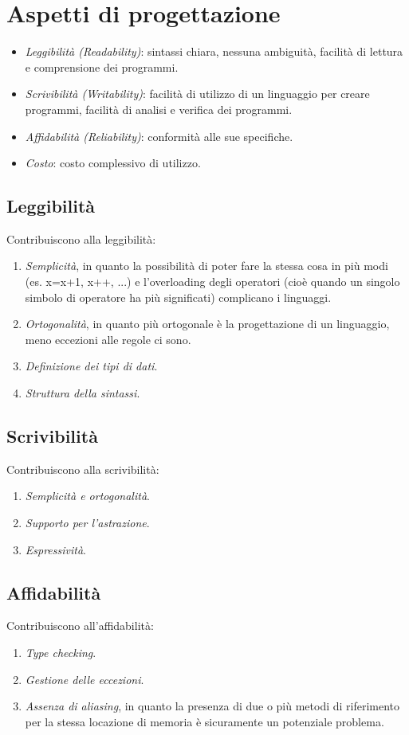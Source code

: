 \documentclass[a4paper,oneside,titlepage]{book}
\begin{document}
\section{Aspetti di progettazione}
\begin{itemize}
	\item \textit{Leggibilità (Readability)}: sintassi chiara, nessuna ambiguità, facilità di lettura e comprensione dei programmi.
	\item \textit{Scrivibilità (Writability)}: facilità di utilizzo di un linguaggio per creare programmi, facilità di analisi e verifica dei programmi.
	\item \textit{Affidabilità (Reliability)}: conformità alle sue specifiche.
	\item \textit{Costo}: costo complessivo di utilizzo.
\end{itemize}

\subsection{Leggibilità}
Contribuiscono alla leggibilità:
\begin{enumerate}
	\item \textit{Semplicità}, in quanto la possibilità di poter fare la stessa cosa in più modi (es. x=x+1, x++, ...) e l'overloading degli operatori (cioè quando un singolo simbolo di operatore ha più significati) complicano i linguaggi.
	\item \textit{Ortogonalità}, in quanto più ortogonale è la progettazione di un linguaggio, meno eccezioni alle regole ci sono.
	\item \textit{Definizione dei tipi di dati}.
	\item \textit{Struttura della sintassi}.
\end{enumerate}

\subsection{Scrivibilità}
Contribuiscono alla scrivibilità:
\begin{enumerate}
	\item \textit{Semplicità e ortogonalità}.
	\item \textit{Supporto per l’astrazione}.
	\item \textit{Espressività}.
\end{enumerate}

\subsection{Affidabilità}
Contribuiscono all'affidabilità:
\begin{enumerate}
	\item \textit{Type checking}.
	\item \textit{Gestione delle eccezioni}.
	\item \textit{Assenza di aliasing}, in quanto la presenza di due o più metodi di riferimento per la stessa locazione di memoria è sicuramente un potenziale problema.
\end{enumerate}
\end{document}
